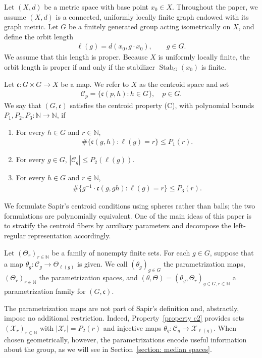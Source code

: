 \documentclass[12pt,reqno]{amsart}
\newcommand{\N}{\mathbb{N}}
\numberwithin{equation}{section}
\begin{document}
Let $(X,d)$ be a metric space with base point $x_0\in X$. Throughout the paper, we assume $(X,d)$ is a connected, uniformly locally finite graph endowed with its graph metric. Let $G$ be a finitely generated group acting isometrically on $X$, and define the orbit length
\begin{align*}
    \ell(g)=d(x_0,g\cdot x_0),\qquad g\in G.
\end{align*}
We assume that this length is proper. Because $X$ is uniformly locally finite, the orbit length is proper if and only if the stabilizer $\operatorname{Stab}_G(x_0)$ is finite.

Let $\mathfrak{c}:G\times G\to X$ be a map. We refer to $X$ as the centroid space and set
\begin{align*}
    \mathcal{C}_p=\{\mathfrak{c}(p,h):h\in G\},\quad p\in G.
\end{align*}
We say that $(G,\mathfrak{c})$ satisfies the centroid property (C), with polynomial bounds $P_1, P_2, P_3:\N\to\N$, if
\begin{enumerate}[label=(C\arabic*)]
    \item\label{property c1} For every $h\in G$ and $r\in \N$, 
    \begin{align*}
        \#\{\mathfrak{c}(g,h): \ell(g)=r\} \le P_1(r).
    \end{align*}
    \item\label{property c2} For every $g\in G$, $|\mathcal{C}_g|\le P_2(\ell(g))$.
    \item\label{property c3} For every $h\in G$ and $r\in \N$,
    \begin{align*}
        \#\{g^{-1}\cdot\mathfrak{c}(g,gh): \ell(g)=r\}\le P_3(r).
    \end{align*}
\end{enumerate}
We formulate Sapir's centroid conditions using spheres rather than balls; the two formulations are polynomially equivalent. One of the main ideas of this paper is to stratify the centroid fibers by auxiliary parameters and decompose the left-regular representation accordingly.

Let $(\Theta_r)_{r\in\N}$ be a family of nonempty finite sets. For each $g\in G$, suppose that a map $\theta_g:\mathcal{C}_g\to\Theta_{\ell(g)}$ is given. We call $(\theta_g)_{g\in G}$ the parametrization maps, $(\Theta_r)_{r\in\N}$ the parametrization spaces, and $(\theta,\Theta)=(\theta_g,\Theta_r)_{g\in G,r\in\N}$ a parametrization family for $(G,\mathfrak{c})$.

The parametrization maps are not part of Sapir's definition and, abstractly, impose no additional restriction. Indeed, Property~\ref{property c2} provides sets $(\mathcal{X}_r)_{r\in\N}$ with $|\mathcal{X}_r|=P_2(r)$ and injective maps $\theta_g:\mathcal{C}_g\to\mathcal{X}_{\ell(g)}$. When chosen geometrically, however, the parametrizations encode useful information about the group, as we will see in Section~\ref{section: median spaces}.
\end{document}
